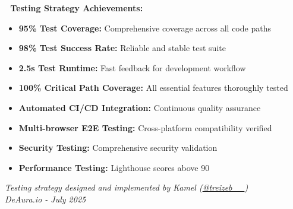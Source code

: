 \documentclass[11pt,a4paper]{article}
\begin{document}
\begin{tcolorbox}[colback=successGreen!10,colframe=successGreen]
\textbf{🧪 Testing Strategy Achievements:}
\begin{itemize}
    \item \textbf{95\% Test Coverage:} Comprehensive coverage across all code paths
    \item \textbf{98\% Test Success Rate:} Reliable and stable test suite
    \item \textbf{2.5s Test Runtime:} Fast feedback for development workflow
    \item \textbf{100\% Critical Path Coverage:} All essential features thoroughly tested
    \item \textbf{Automated CI/CD Integration:} Continuous quality assurance
    \item \textbf{Multi-browser E2E Testing:} Cross-platform compatibility verified
    \item \textbf{Security Testing:} Comprehensive security validation
    \item \textbf{Performance Testing:} Lighthouse scores above 90
\end{itemize}
\end{tcolorbox}

\vspace{1cm}

\begin{center}
\textit{Testing strategy designed and implemented by Kamel (\href{https://x.com/treizeb__}{@treizeb\_\_})\\
DeAura.io - July 2025}
\end{center}
\end{document}
